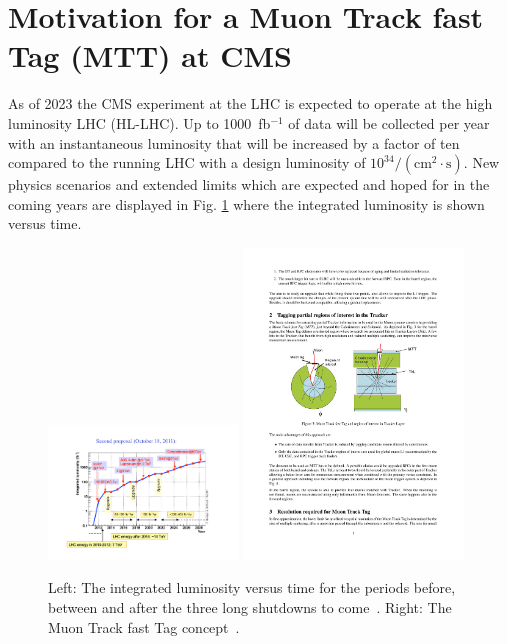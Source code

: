 \section{Motivation for a Muon Track fast Tag (MTT) at CMS}
\label{sec:intro}
As of 2023 the CMS experiment at the LHC is expected to operate at the high luminosity LHC (HL-LHC). Up to 1000~fb$^{-1}$ of data will be collected per year with an 
instantaneous luminosity that will be increased by a factor of ten compared to the running LHC with a design luminosity of $10^{34}/(\mathrm{cm}^2 \cdot\mathrm{s})$. New physics 
scenarios and extended limits which are expected and hoped for in the coming years are displayed in Fig. \ref{fig:schedule_concept} where the integrated luminosity is shown versus 
time. 
\begin{figure}[htbp]
\centering
\includegraphics[width=0.45\textwidth]{Figures/pooth/schedule.pdf}
\includegraphics[width=0.52\textwidth]{Figures/pooth/mtt_concept_a.pdf}
\caption{Left: The integrated luminosity versus time for the periods before, between and after the three long shutdowns to come~\cite{schedule}. Right: The Muon Track fast Tag concept~\cite{mtt_concept}. } 
\label{fig:schedule_concept}
\end{figure}
